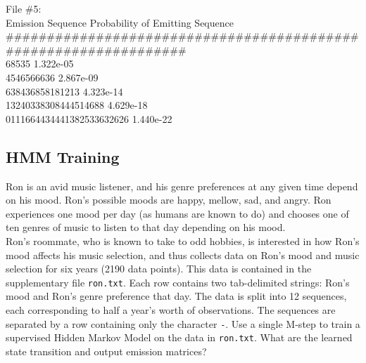 \begin{solution}
  File \#5:\\
  Emission Sequence             Probability of Emitting Sequence\\
  \footnotesize \#\#\#\#\#\#\#\#\#\#\#\#\#\#\#\#\#\#\#\#\#\#\#\#\#\#\#\#\#\#\#\#\#\#\#\#\#\#\#\#\#\#\#\#\#\#\#\#\#\#\#\#\#\#\#\#\#\#\#\#\#\#\#\#\#\\
  68535                         1.322e-05 \\
  4546566636                    2.867e-09 \\
  638436858181213               4.323e-14 \\
  13240338308444514688          4.629e-18 \\
  0111664434441382533632626     1.440e-22 \\
  
  
\end{solution}

\subsection{HMM Training}
Ron is an avid music listener, and his genre preferences at any given time depend on his mood. Ron's possible moods are happy, mellow, sad, and angry. Ron experiences one mood per day (as humans are known to do) and chooses one of ten genres of music to listen to that day depending on his mood. \\

Ron's roommate, who is known to take to odd hobbies, is interested in how Ron's mood affects his music selection, and thus collects data on Ron's mood and music selection for six years (2190 data points). This data is contained in the supplementary file \texttt{ron.txt}. Each row contains two tab-delimited strings: Ron's mood and Ron's genre preference that day. The data is split into 12 sequences, each corresponding to half a year's worth of observations. The sequences are separated by a row containing only the character \texttt{-}.
\noindent\problem[10] %
Use a single M-step to train a supervised Hidden Markov Model on the data in \texttt{ron.txt}. What are the learned state transition and output emission matrices?

